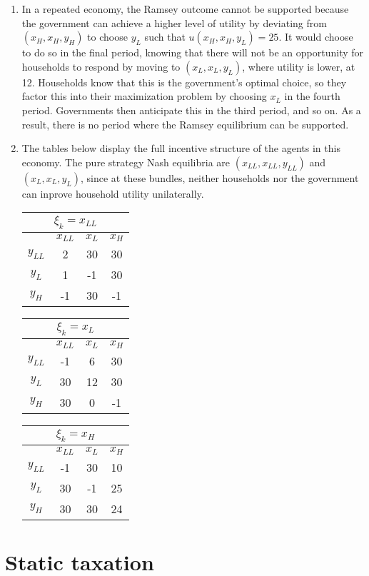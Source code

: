 \documentclass{article}
\begin{document}
\begin{enumerate}
	\item In a repeated economy, the Ramsey outcome cannot be supported because the government can achieve a higher level of utility by deviating from $(x_H,x_H,y_H)$ to choose $y_L$ such that $u(x_H,x_H,y_L)=25$. It would choose to do so in the final period, knowing that there will not be an opportunity for households to respond by moving to $(x_L,x_L,y_L)$, where utility is lower, at 12. Households know that this is the government's optimal choice, so they factor this into their maximization problem by choosing $x_L$ in the fourth period. Governments then anticipate this in the third period, and so on. As a result, there is no period where the Ramsey equilibrium can be supported.
	
	\item  The tables below display the full incentive structure of the agents in this economy. The pure strategy Nash equilibria are $(x_{LL},x_{LL},y_{LL})$ and $(x_L,x_L,y_L)$, since at these bundles, neither households nor the government can inprove household utility unilaterally.
	\begin{center}
		\begin{tabular}{|c|c|c|c|}
			\multicolumn{4}{c}{$\xi_k=x_{LL}$}	\\ \hline
					&$x_{LL}$ & $x_L$ & $x_H$ \\ \hline 
		$y_{LL}$	& 2 	 & 30 	 & 30	\\ \hline
		$y_L$		& 1 	 & -1 	 & 30	\\ \hline
		$y_H$		& -1  	 & 30 	 & -1	\\ \hline
		\end{tabular} \quad
		\begin{tabular}{|c|c|c|c|}
			\multicolumn{4}{c}{$\xi_k=x_L$}	\\ \hline
					&$x_{LL}$ & $x_L$ & $x_H$ \\ \hline 
		$y_{LL}$	& -1 	 & 6 	 & 30	\\ \hline
		$y_L$		& 30 	 & 12 	 & 30	\\ \hline
		$y_H$		& 30  	 & 0 	 & -1	\\ \hline
		\end{tabular} \quad
		\begin{tabular}{|c|c|c|c|}
			\multicolumn{4}{c}{$\xi_k=x_H$}	\\ \hline
				    &$x_{LL}$ & $x_L$ & $x_H$ \\ \hline 
		$y_{LL}$	& -1 	 & 30 	 & 10	\\ \hline
		$y_L$		& 30 	 & -1 	 & 25	\\ \hline
		$y_H$		& 30  	 & 30 	 & 24	\\ \hline
		\end{tabular}
	\end{center}
\end{enumerate}


\section{Static taxation}


\end{document}
